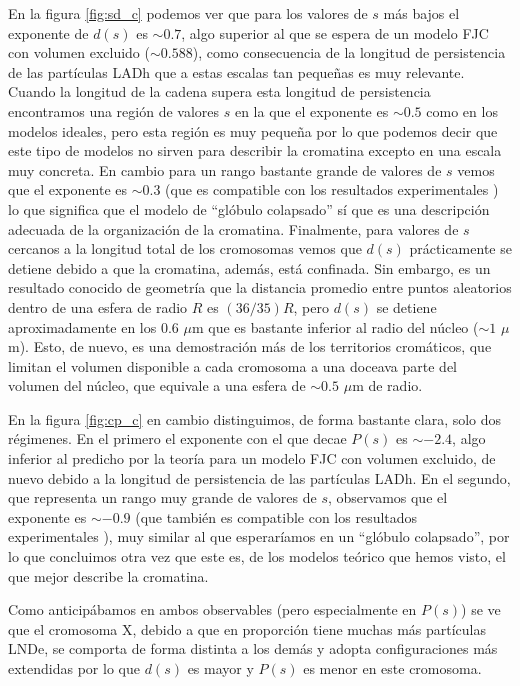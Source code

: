 En la figura \ref{fig:sd_c} podemos ver que para los valores de $s$ más bajos el exponente de $d(s)$ es $\sim0.7$, algo superior al que se espera de un modelo FJC con volumen excluido ($\sim0.588$), como consecuencia de la longitud de persistencia de las partículas LADh que a estas escalas tan pequeñas es muy relevante. Cuando la longitud de la cadena supera esta longitud de persistencia encontramos una región de valores $s$ en la que el exponente es $\sim0.5$ como en los modelos ideales, pero esta región es muy pequeña por lo que podemos decir que este tipo de modelos no sirven para describir la cromatina excepto en una escala muy concreta. En cambio para un rango bastante grande de valores de $s$ vemos que el exponente es $\sim0.3$ (que es compatible con los resultados experimentales \cite{Wang2016}) lo que significa que el modelo de ``glóbulo colapsado'' sí que es una descripción adecuada de la organización de la cromatina. Finalmente, para valores de $s$ cercanos a la longitud total de los cromosomas vemos que $d(s)$ prácticamente se detiene debido a que la cromatina, además, está confinada. Sin embargo, es un resultado conocido de geometría que la distancia promedio entre puntos aleatorios dentro de una esfera de radio $R$ es $(36/35)R$, pero $d(s)$ se detiene aproximadamente en los $0.6$ $\mu$m que es bastante inferior al radio del núcleo ($\sim1$ $\mu$m). Esto, de nuevo, es una demostración más de los territorios cromáticos, que limitan el volumen disponible a cada cromosoma a una doceava parte del volumen del núcleo, que equivale a una esfera de $\sim0.5$ $\mu$m de radio.

En la figura \ref{fig:cp_c} en cambio distinguimos, de forma bastante clara, solo dos régimenes. En el primero el exponente con el que decae $P(s)$ es $\sim-2.4$, algo inferior al predicho por la teoría para un modelo FJC con volumen excluido, de nuevo debido a la longitud de persistencia de las partículas LADh. En el segundo, que representa un rango muy grande de valores de $s$, observamos que el exponente es $\sim-0.9$ (que también es compatible con los resultados experimentales \cite{Wang2016}), muy similar al que esperaríamos en un ``glóbulo colapsado'', por lo que concluimos otra vez que este es, de los modelos teórico que hemos visto, el que mejor describe la cromatina.

Como anticipábamos en ambos observables (pero especialmente en $P(s)$) se ve que el cromosoma X, debido a que en proporción tiene muchas más partículas LNDe, se comporta de forma distinta a los demás y adopta configuraciones más extendidas por lo que $d(s)$ es mayor y $P(s)$ es menor en este cromosoma.

